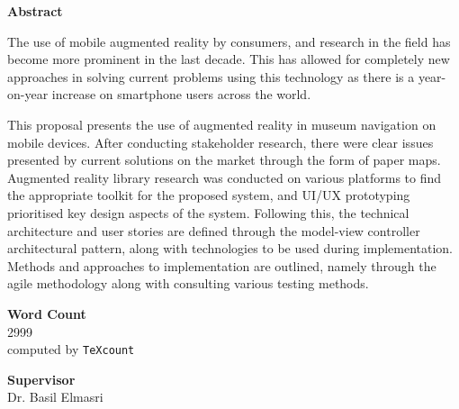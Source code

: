 \documentclass[12pt]{report}
\newcommand\blankpage{%
    \null
    \thispagestyle{empty}%
    \addtocounter{page}{-1}%
    \newpage}
\begin{document}
\begin{center}        
    \large
    \textbf{Abstract}\\
\end{center}

The use of mobile augmented reality by consumers, and research in the field has become more prominent in the last decade. This has allowed for completely new approaches in solving current problems using this technology as there is a year-on-year increase on smartphone users across the world. 

This proposal presents the use of augmented reality in museum navigation on mobile devices. After conducting stakeholder research, there were clear issues presented by current solutions on the market through the form of paper maps. Augmented reality library research was conducted on various platforms to find the appropriate toolkit for the proposed system, and UI/UX prototyping prioritised key design aspects of the system. Following this, the technical architecture and user stories are defined through the model-view controller architectural pattern, along with technologies to be used during implementation. Methods and approaches to implementation are outlined, namely through the agile methodology along with consulting various testing methods.

\vspace*{1.5cm}
\begin{center}    
    \large
    \textbf{Word Count}\\
    2999\\
    \normalsize computed by \texttt{TeXcount}
\end{center}

\vspace*{1.5cm}
\begin{center}    
    \large
    \textbf{Supervisor}\\
    \normalsize Dr. Basil Elmasri
\end{center}

\afterpage{\blankpage}


\setcounter{tocdepth}{0}
\tableofcontents

\setcounter{tocdepth}{1}
\listoffigures


\printnomenclature[1in]

\afterpage{\blankpage}
\end{document}
